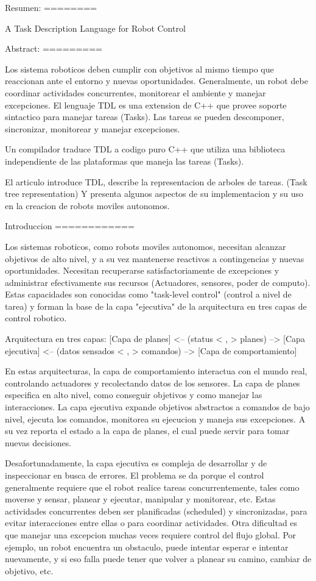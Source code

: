 
Resumen:
========

A Task Description Language for Robot Control

Abstract:
=========

Los sistema roboticos deben cumplir con objetivos al mismo tiempo que reaccionan ante el entorno y nuevas oportunidades.
Generalmente, un robot debe coordinar actividades concurrentes, monitorear el ambiente y manejar excepciones.
El lenguaje TDL es una extension de C++ que provee soporte sintactico para manejar tareas (Tasks). 
Las tareas se pueden descomponer, sincronizar, monitorear y manejar excepciones.

Un compilador traduce TDL a codigo puro C++ que utiliza una biblioteca independiente de las plataformas que maneja las tareas (Tasks).

El articulo introduce TDL, describe la representacion de arboles de tareas. (Task tree representation)
Y presenta algunos aspectos de su implementacion y su uso en la creacion de robots moviles autonomos.

Introduccion
============

Los sistemas roboticos, como robots moviles autonomos, necesitan alcanzar objetivos de alto nivel, y a su vez
mantenerse reactivos a contingencias y nuevas oportunidades.
Necesitan recuperarse satisfactoriamente de excepciones y administrar efectivamente sus recursos (Actuadores, sensores, poder de computo).
Estas capacidades son conocidas como "task-level control" (control a nivel de tarea) y forman la base de la capa "ejecutiva" de 
la arquitectura en tres capas de control robotico.

Arquitectura en tres capas:
   [Capa de planes] <-- (status < , > planes) --> [Capa ejecutiva] <-- (datos sensados < , > comandos) --> [Capa de comportamiento]

En estas arquitecturas, la capa de comportamiento interactua con el mundo real, controlando actuadores y recolectando datos de los sensores.
La capa de planes especifica en alto nivel, como conseguir objetivos y como manejar las interacciones.
La capa ejecutiva expande objetivos abstractos a comandos de bajo nivel, ejecuta los comandos, monitorea su ejecucion y maneja sus excepciones. A su 
vez reporta el estado a la capa de planes, el cual puede servir para tomar nuevas decisiones.


Desafortunadamente, la capa ejecutiva es compleja de desarrollar y de inspeccionar en busca de errores. 
El problema se da porque el control generalmente requiere que el robot realice tareas concurrentemente, tales como moverse y sensar, 
planear y ejecutar, manipular y monitorear, etc.
Estas actividades concurrentes deben ser planificadas (scheduled) y sincronizadas, para evitar interacciones entre ellas o para coordinar actividades.
Otra dificultad es que manejar una excepcion muchas veces requiere control del flujo global.
Por ejemplo, un robot encuentra un obstaculo, puede intentar esperar e intentar nuevamente, y si eso falla puede tener que volver a 
planear su camino, cambiar de objetivo, etc.


